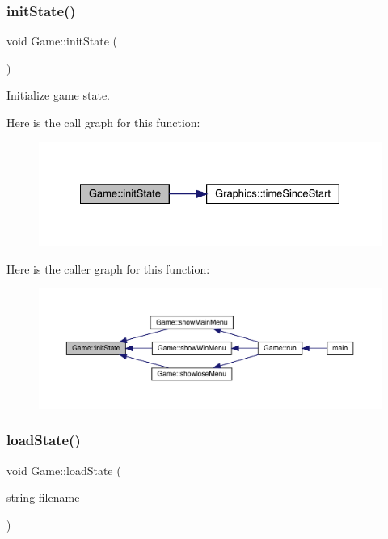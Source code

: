 \subsubsection{\texorpdfstring{init\+State()}{initState()}}
{\footnotesize\ttfamily void Game\+::init\+State (\begin{DoxyParamCaption}{ }\end{DoxyParamCaption})}



Initialize game state. 

Here is the call graph for this function\+:\nopagebreak
\begin{figure}[H]
\begin{center}
\leavevmode
\includegraphics[width=328pt]{class_game_a741532226fb50fd8113b0e2a0f162858_cgraph}
\end{center}
\end{figure}
Here is the caller graph for this function\+:
\nopagebreak
\begin{figure}[H]
\begin{center}
\leavevmode
\includegraphics[width=350pt]{class_game_a741532226fb50fd8113b0e2a0f162858_icgraph}
\end{center}
\end{figure}
\mbox{\label{class_game_a89e4124211cd2158244b9860b46c4767}} 
\subsubsection{\texorpdfstring{load\+State()}{loadState()}}
{\footnotesize\ttfamily void Game\+::load\+State (\begin{DoxyParamCaption}\item[{string}]{filename }\end{DoxyParamCaption})}



